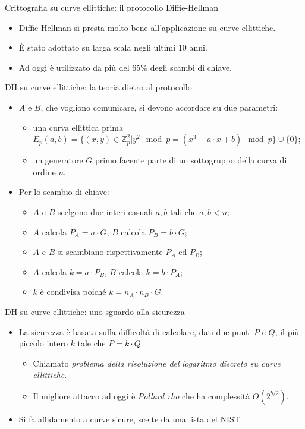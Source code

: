 \documentclass[11pt,svgnames,smaller,aspectratio=169,italian]{beamer}
\begin{document}
\begin{frame}{Crittografia su curve ellittiche: il protocollo Diffie-Hellman}
	\begin{itemize}
		\item Diffie-Hellman si presta molto bene all'applicazione su curve ellittiche.
		\item È stato adottato su larga scala negli ultimi 10 anni.
		\item Ad oggi è utilizzato da più del 65\% degli scambi di chiave.
	\end{itemize}
\end{frame}

\begin{frame}{DH su curve ellittiche: la teoria dietro al protocollo}
	\begin{itemize}
		\item $A$ e $B$, che vogliono comunicare, si devono accordare su due parametri:
			\begin{itemize}
				\item una curva ellittica prima $E_{p}(a, b) = \{(x, y) \in \mathds{Z}_{p}^{2} | y^{2} \mod p = (x^{3} + a \cdot x + b) \mod p \} \cup \{0\}$;
				\item un generatore $G$ primo facente parte di un sottogruppo della curva di ordine $n$.
			\end{itemize}
		\item Per lo scambio di chiave:
			\begin{itemize}
				\item $A$ e $B$ scelgono due interi casuali $a, b$ tali che $a, b < n$;
				\item $A$ calcola $P_{A} = a \cdot G$, $B$ calcola $P_{B} = b \cdot G$;
				\item $A$ e $B$ si scambiano rispettivamente $P_{A}$ ed $P_{B}$;
				\item $A$ calcola $k = a \cdot P_{B}$, $B$ calcola $k = b \cdot P_{A}$;
				\item $k$ è condivisa poiché $k = n_{A} \cdot n_{B} \cdot G$.
			\end{itemize}
	\end{itemize}
\end{frame}

\begin{frame}{DH su curve ellittiche: uno sguardo alla sicurezza}
	\begin{itemize}
		\item La sicurezza è basata sulla difficoltà di calcolare, dati due punti $P$ e $Q$, il più piccolo intero $k$ tale che $P = k \cdot Q$.
			\begin{itemize}
				\item Chiamato \emph{problema della risoluzione del logaritmo discreto su curve ellittiche}.
				\item Il migliore attacco ad oggi è \emph{Pollard rho} che ha complessità $O(2^{b/2})$.
			\end{itemize}
		\item Si fa affidamento a curve sicure, scelte da una lista del NIST.
	\end{itemize}
\end{frame}
\end{document}
